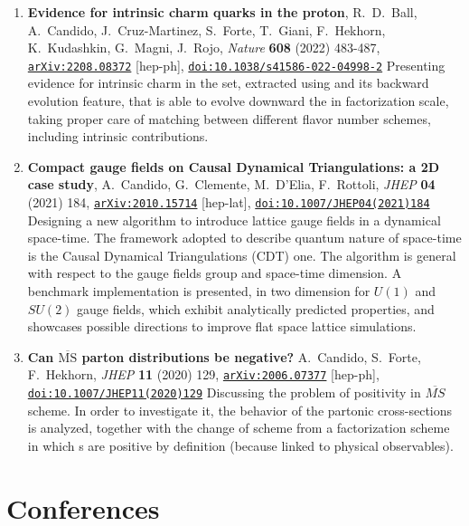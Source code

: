 \documentclass[10pt, a4paper, sans]{moderncv}
\newcommand{\journal}[4]{\textit{#1} \textbf{#2} (#3) #4}
\newcommand{\doi}[1]{\texttt{\href{https://doi.org/#1}{doi:#1}}}
\newcommand{\arxiv}[2]{\texttt{\href{https://arxiv.org/abs/#1}{arXiv:#1}} [#2]}
\begin{document}
\begin{multicols}{2}
\begin{enumerate}
    \item \textbf{Evidence for intrinsic charm quarks in the proton},
      R.~D.~Ball, A.~Candido, J.~Cruz-Martinez, S.~Forte, T.~Giani, F.~Hekhorn,
      K.~Kudashkin, G.~Magni, J.~Rojo, 
      \journal{Nature}{608}{2022}{483-487},
      \arxiv{2208.08372}{hep-ph},
      \doi{10.1038/s41586-022-04998-2}
      \newline
      Presenting evidence for intrinsic charm in the  \pdf set,
      extracted using \eko and its backward evolution feature, that is able to
      evolve downward the \pdf in factorization scale, taking proper care of
      matching between different flavor number schemes, including intrinsic
      contributions.
    \item \textbf{Compact gauge fields on Causal Dynamical Triangulations: a 2D
      case study},
      A.~Candido, G.~Clemente, M.~D'Elia, F.~Rottoli,
      \journal{JHEP}{04}{2021}{184},
      \arxiv{2010.15714}{hep-lat},
      \doi{10.1007/JHEP04(2021)184} 
      \newline
      Designing a new algorithm to introduce lattice gauge fields in a
      dynamical space-time. The framework adopted to describe quantum nature of
      space-time is the Causal Dynamical Triangulations ({\small CDT}) one.
      The algorithm is general with respect to the gauge fields group and
      space-time dimension.
      A benchmark implementation is presented, in two dimension for $U(1)$ and
      $SU(2)$ gauge fields, which exhibit analytically predicted properties,
      and showcases possible directions to improve flat space lattice simulations.
    \item \textbf{Can $ \overline{\mathrm{MS}} $ parton distributions be negative?}
      A.~Candido, S.~Forte, F.~Hekhorn,
      \journal{JHEP}{11}{2020}{129},
      \arxiv{2006.07377}{hep-ph},
      \doi{10.1007/JHEP11(2020)129}
      \newline
      Discussing the problem of \pdf positivity in $\overline{MS}$ scheme. In
      order to investigate it, the behavior of the partonic cross-sections is
      analyzed, together with the change of scheme from a factorization scheme
      in which \pdf{}s are positive by definition (because linked to physical
      observables).
\end{enumerate}

\columnbreak

\section{Conferences}


\end{multicols}
\end{document}
